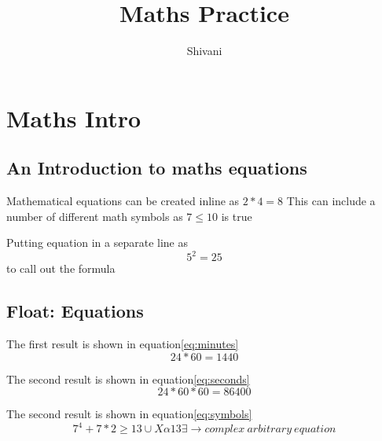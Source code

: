 \documentclass{article}
\begin{document}
\title{Maths Practice}
\author{Shivani}
\maketitle

\section{Maths Intro}

\subsection{An Introduction to maths equations}

Mathematical equations can be created inline as $2*4=8$
This can include a number of different math symbols as $7\leq 10$ is true

Putting equation in a separate line as \[5^2=25\] to call out the formula
  

\subsection{Float: Equations}
The first result is shown in equation\ref{eq:minutes}
\begin{equation}
24*60=1440
\label{eq:minutes}
\end{equation}


The second result is shown in equation\ref{eq:seconds}
\begin{equation}
24*60*60=86400
\label{eq:seconds}
\end{equation}


The second result is shown in equation\ref{eq:symbols}
\begin{equation}
7^4+7*2\geq 13\cup X\alpha 13\exists \rightarrow complex\ arbitrary\ equation
\label{eq:symbols}
\end{equation}
\end{document}
